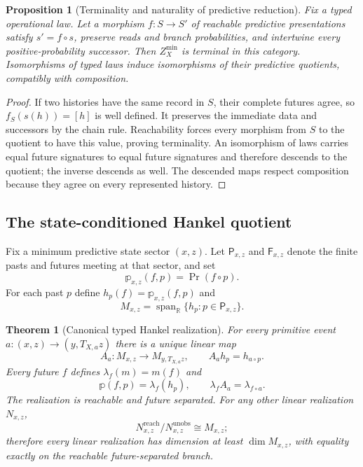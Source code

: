 \documentclass[11pt]{article}
\newtheorem{theorem}{Theorem}[section]
\numberwithin{equation}{section}
\newtheorem{proposition}[proposition]{Proposition}
\theoremstyle{definition}
\theoremstyle{remark}
\newcommand{\R}{\mathbb R}
\newcommand{\Span}{\operatorname{span}}
\begin{document}
\begin{proposition}[Terminality and naturality of predictive reduction]
\label{prop:supp-predictive-category}
Fix a typed operational law. Let a morphism $f:S\to S'$ of reachable
predictive presentations satisfy $s'=f\circ s$, preserve reads and branch
probabilities, and intertwine every positive-probability successor. Then
$Z_X^{\min}$ is terminal in this category. Isomorphisms of typed laws induce
isomorphisms of their predictive quotients, compatibly with composition.
\end{proposition}
\begin{proof}
If two histories have the same record in $S$, their complete futures agree,
so $f_S(s(h))=[h]$ is well defined. It preserves the immediate data and
successors by the chain rule. Reachability forces every morphism from $S$
to the quotient to have this value, proving terminality. An isomorphism of
laws carries equal future signatures to equal future signatures and therefore
descends to the quotient; the inverse descends as well. The descended maps
respect composition because they agree on every represented history.
\end{proof}


\subsection{The state-conditioned Hankel quotient}

Fix a minimum predictive state sector $(x,z)$.  Let
$\mathsf P_{x,z}$ and $\mathsf F_{x,z}$ denote the finite pasts and futures
meeting at that sector, and set
\begin{equation}
 \mathbb p_{x,z}(f,p)=\Pr(f\circ p).
 \label{eq:supp-Hankel-table}
\end{equation}
For each past $p$ define $h_p(f)=\mathbb p_{x,z}(f,p)$ and
\begin{equation}
 M_{x,z}=\Span_{\R}\{h_p:p\in\mathsf P_{x,z}\}.
 \label{eq:supp-hankel-space}
\end{equation}

\begin{theorem}[Canonical typed Hankel realization]
\label{thm:supp-hankel}
For every primitive event
$a:(x,z)\to(y,T_{X,a}z)$ there is a unique linear map
\begin{equation}
 A_a:M_{x,z}\longrightarrow M_{y,T_{X,a}z},
 \qquad A_ah_p=h_{a\circ p}.
 \label{eq:supp-hankel-transition}
\end{equation}
Every future $f$ defines $\lambda_f(m)=m(f)$ and
\begin{equation}
 \mathbb p(f,p)=\lambda_f(h_p),
 \qquad
 \lambda_fA_a=\lambda_{f\circ a}.
 \label{eq:supp-hankel-evaluation}
\end{equation}
The realization is reachable and future separated.  For any other linear
realization $N_{x,z}$,
\begin{equation}
 N_{x,z}^{\mathrm{reach}}/N_{x,z}^{\mathrm{unobs}}
 \cong M_{x,z};
 \label{eq:supp-hankel-minimality}
\end{equation}
therefore every linear realization has dimension at least $\dim M_{x,z}$,
with equality exactly on the reachable future-separated branch.
\end{theorem}
\end{document}
